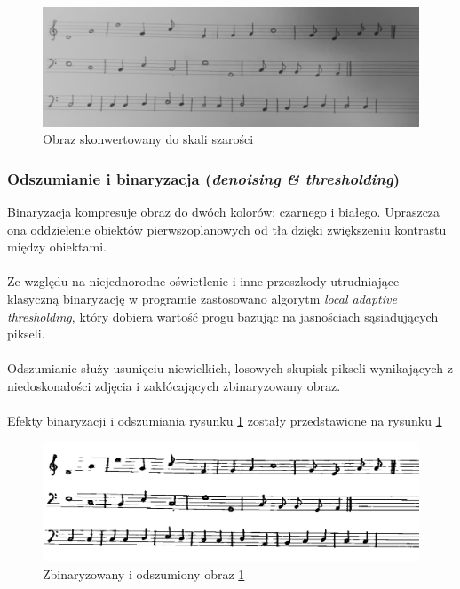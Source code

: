 \documentclass[12pt, letterpaper]{article}
\begin{document}
\begin{figure}
    \centering
    \includegraphics[width=\imagewidth]{1_desaturated}
    \caption[Desaturated]{Obraz skonwertowany do skali szarości}
    \label{img:desaturated}
\end{figure}

\subsubsection{Odszumianie i binaryzacja (\textit{\small denoising \& thresholding})}
\label{subsec:binarization}

Binaryzacja kompresuje obraz do dwóch kolorów: czarnego i białego.
Upraszcza ona oddzielenie obiektów pierwszoplanowych od tła dzięki zwiększeniu kontrastu
między obiektami.
\\
\\
Ze względu na niejednorodne oświetlenie i inne przeszkody utrudniające
klasyczną binaryzację w programie zastosowano algorytm
\emph{local adaptive thresholding}, który dobiera wartość progu bazując na
jasnościach sąsiadujących pikseli.
\\
\\
Odszumianie służy usunięciu niewielkich, losowych skupisk pikseli
wynikających z niedoskonałości zdjęcia i zakłócających zbinaryzowany obraz.
\\
\\
Efekty binaryzacji i odszumiania rysunku \ref{img:desaturated} zostały przedstawione na
rysunku \ref{img:desaturated}

\begin{figure}
    \centering
    \includegraphics[width = \imagewidth]{2_binarized}
    \caption[Binarized]{Zbinaryzowany i odszumiony obraz \ref{img:desaturated}}
    \label{img:binarized}
\end{figure}
\end{document}
